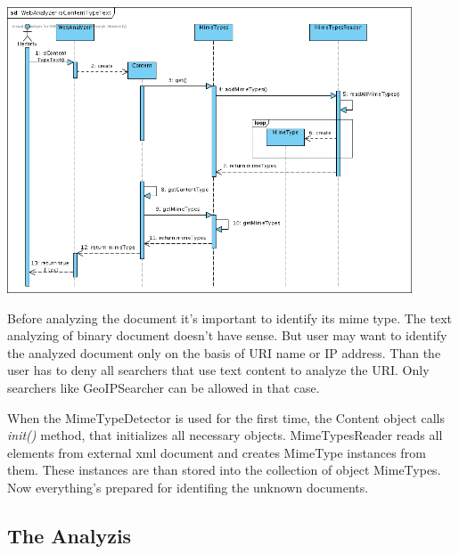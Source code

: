 \documentclass[11pt,a4paper]{article}
\begin{document}
\begin{center}
\includegraphics[width=120mm]{SD2.png}
\end{center}

Before analyzing the document it's important to identify its mime type. The text analyzing of binary document doesn't have sense. But user may want to identify the analyzed document only on the basis of URI name or IP address. Than the user has to deny all searchers that use text content to analyze the URI. Only searchers like GeoIPSearcher can be allowed in that case.

When the MimeTypeDetector is used for the first time, the Content object calls \emph{init()} method, that initializes all necessary objects. MimeTypesReader reads all elements from external xml document and creates MimeType instances from them. These instances are than stored into the collection of object MimeTypes. Now everything's prepared for identifing the unknown documents.

\subsection{The Analyzis}
\end{document}
